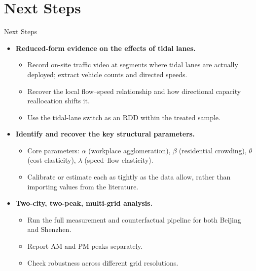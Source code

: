 \documentclass[11pt,aspectratio=169]{beamer}
\newcommand{\good}[1]{\textcolor{blue!70!black}{#1}}
\newcommand{\app}[1]{\allowbreak\hspace{0.25em}\hyperlink{#1}{\beamergotobutton{details}}}
\begin{document}
\section{Next Steps}
\begin{frame}[label=nextsteps]{Next Steps}
\small
\begin{itemize}
  \item \textbf{Reduced-form evidence on the effects of tidal lanes.}
  \begin{itemize}\footnotesize
    \item Record on-site traffic video at segments where tidal lanes are actually deployed; extract vehicle counts and directed speeds.
    \item Recover the local flow--speed relationship and how directional capacity reallocation shifts it.
    \item Use the tidal-lane switch as an RDD within the treated sample. \app{appfieldvisit}
  \end{itemize}
  \item \textbf{Identify and recover the key structural parameters.}
  \begin{itemize}\footnotesize
    \item Core parameters: $\alpha$ (workplace agglomeration), $\beta$ (residential crowding), $\theta$ (cost elasticity), $\lambda$ (speed--flow elasticity).
    \item Calibrate or estimate each as tightly as the data allow, rather than importing values from the literature.
  \end{itemize}
  \item \textbf{Two-city, two-peak, multi-grid analysis.}
  \begin{itemize}\footnotesize
    \item Run the full measurement and counterfactual pipeline for both \good{Beijing} and \good{Shenzhen}.
    \item Report \good{AM} and \good{PM} peaks separately.
    \item Check robustness across different grid resolutions.
  \end{itemize}
\end{itemize}
\end{frame}

\appendix
\end{document}
